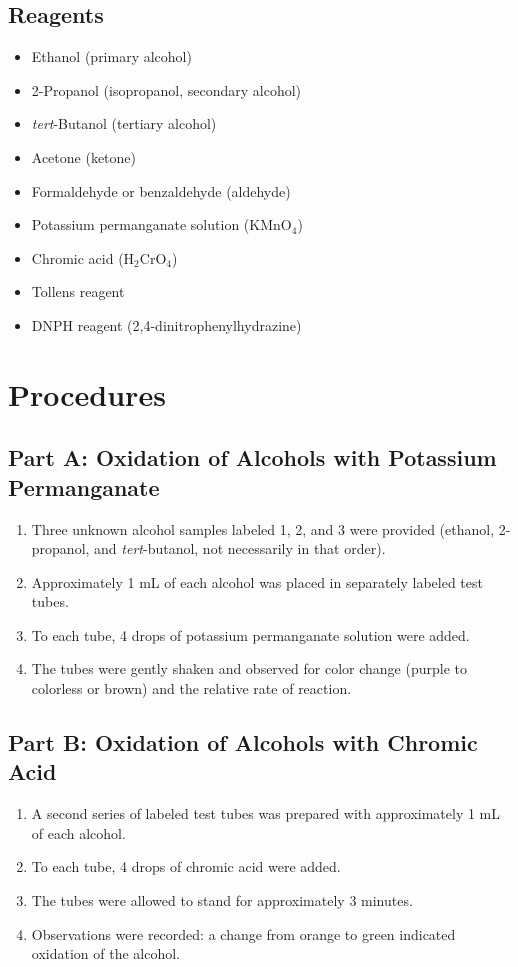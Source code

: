 \documentclass[12pt, a4paper]{article}
\begin{document}
\subsection{Reagents}
\begin{itemize}
    \item Ethanol (primary alcohol)
    \item 2-Propanol (isopropanol, secondary alcohol)
    \item \textit{tert}-Butanol (tertiary alcohol)
    \item Acetone (ketone)
    \item Formaldehyde or benzaldehyde (aldehyde)
    \item Potassium permanganate solution ($\text{KMnO}_4$)
    \item Chromic acid ($\text{H}_2\text{CrO}_4$)
    \item Tollens reagent
    \item DNPH reagent (2,4-dinitrophenylhydrazine)
\end{itemize}

\section{Procedures}

\subsection{Part A: Oxidation of Alcohols with Potassium Permanganate}
\begin{enumerate}
    \item Three unknown alcohol samples labeled 1, 2, and 3 were provided (ethanol, 2-propanol, and \textit{tert}-butanol, not necessarily in that order).
    \item Approximately 1 mL of each alcohol was placed in separately labeled test tubes.
    \item To each tube, 4 drops of potassium permanganate solution were added.
    \item The tubes were gently shaken and observed for color change (purple to colorless or brown) and the relative rate of reaction.
\end{enumerate}

\subsection{Part B: Oxidation of Alcohols with Chromic Acid}
\begin{enumerate}
    \item A second series of labeled test tubes was prepared with approximately 1 mL of each alcohol.
    \item To each tube, 4 drops of chromic acid were added.
    \item The tubes were allowed to stand for approximately 3 minutes.
    \item Observations were recorded: a change from orange to green indicated oxidation of the alcohol.
\end{enumerate}
\end{document}
